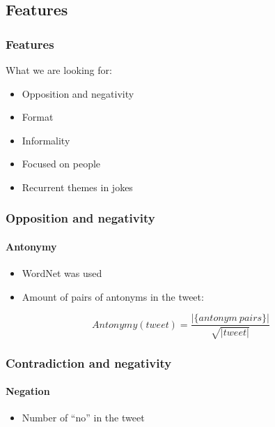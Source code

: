 \subsection{Features}

\begin{frame}
    \frametitle{Features}

    What we are looking for:

    \begin{itemize}
        \item Opposition and negativity
        \item Format
        \item Informality
        \item Focused on people
        \item Recurrent themes in jokes
    \end{itemize}
\end{frame}


\begin{frame}
    \frametitle{Opposition and negativity}
    \framesubtitle{Antonymy}

    \begin{itemize}
        \item WordNet was used
        \item Amount of pairs of antonyms in the tweet:
    \end{itemize}

    \begin{center}
        \[
            Antonymy(tweet) = \frac{|\{antonym\ pairs\}|}{\sqrt{|tweet|}}
        \]
    \end{center}
\end{frame}


\begin{frame}
    \frametitle{Contradiction and negativity}
    \framesubtitle{Negation}

    \begin{itemize}
        \item Number of ``no'' in the tweet
    \end{itemize}
\end{frame}


